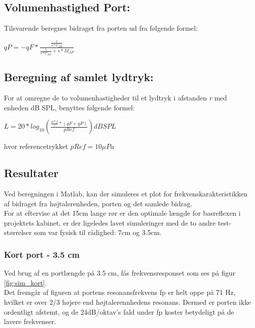 


\subsection{Volumenhastighed Port:}

Tilsvarende beregnes bidraget fra porten ud fra følgende formel:

{\large\(qP=-qF*\)}{\Large \(\frac{\frac{1}{s*C_{AB}}}{\frac{1}{s*C_{AB}}+s*M_{AP}}\) }
\cite{Elektroakustik}


\subsection{Beregning af samlet lydtryk:}

For at omregne de to volumenhastigheder til et lydtryk i afstanden \textit{r} med enheden dB SPL, benyttes følgende formel:

\(L=20*log_{10}(\frac{\frac{\rho*f}{r}*(qF+qP)}{pRef}) dB SPL\)

hvor referencetrykket $pRef=10  \mu Pa$


\subsection{Resultater}

Ved beregningen i Matlab, kan der simuleres et plot for frekvenskarakteristikken af bidraget fra højtalerenheden, porten og det samlede bidrag. \\
For at eftervise at det 15cm lange rør er den optimale længde for basreflexen i projektets kabinet, er der ligeledes lavet simuleringer med de to andre test-størrelser som var fysisk til rådighed: 7cm og 3.5cm.

\subsubsection{Kort port - 3.5 cm}

Ved brug af en portlængde på 3.5 cm, fås frekvensresponset som ses på figur \ref{fig:sim_kort}. \\
Det fremgår af figuren at portens resonansfrekvens fp er helt oppe på 71 Hz, hvilket er over 2/3 højere end højtalerennhedens resonans. Dermed er porten ikke ordentligt afstemt, og de 24dB/oktav's fald under fp koster betydeligt på de lavere frekvenser. 

